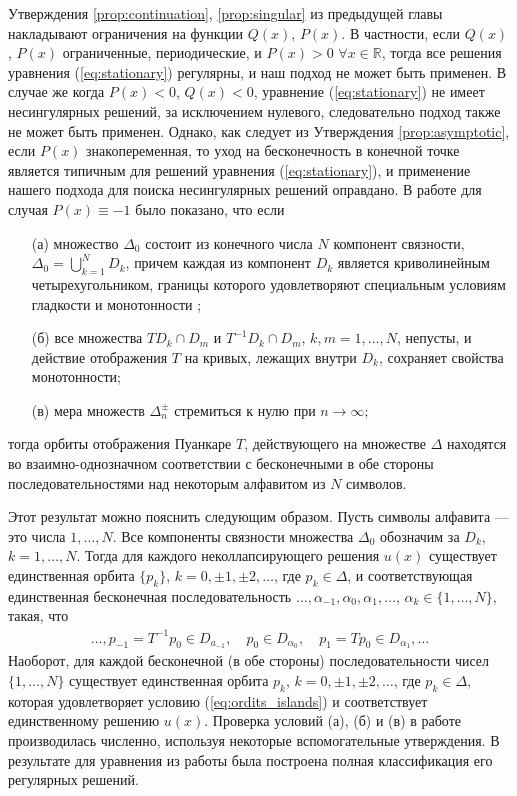 Утверждения \ref{prop:continuation}, \ref{prop:singular} из предыдущей главы накладывают ограничения на функции $Q(x)$, $P(x)$.
В частности, если $Q(x)$, $P(x)$ ограниченные, периодические, и $P(x) > 0$ $\forall x \in \mathbb{R}$, тогда все решения уравнения (\ref{eq:stationary}) регулярны, и наш подход не может быть применен.
В случае же когда $P(x) < 0$, $Q(x) < 0$, уравнение (\ref{eq:stationary}) не имеет несингулярных решений, за исключением нулевого, следовательно подход также не может быть применен.
Однако, как следует из Утверждения \ref{prop:asymptotic}, если $P(x)$ знакопеременная, то уход на бесконечность в конечной точке является типичным для решений уравнения (\ref{eq:stationary}), и применение нашего подхода для поиска несингулярных решений оправдано.
В работе \cite{AlfAvr} для случая $P(x) \equiv -1$ было показано, что если
%
\begin{itemize}
\item[(а)] множество $\Delta_0$ состоит из конечного числа $N$ компонент связности, $\Delta_0 = \bigcup_{k=1}^N D_k$, причем каждая из компонент $D_k$ является криволинейным четырехугольником, границы которого удовлетворяют специальным условиям гладкости и монотонности \cite{AlfAvr};
\item[(б)] все множества $T D_k \cap D_m$ и $T^{-1} D_k \cap D_m$, $k,m = 1, \dots, N$, непусты, и действие отображения $T$ на кривых, лежащих внутри $D_k$, сохраняет свойства монотонности;
\item[(в)] мера множеств $\Delta_n^{\pm}$ стремиться к нулю при $n \to \infty$; 
\end{itemize}
%
тогда орбиты отображения Пуанкаре $T$, действующего на множестве $\Delta$ находятся во взаимно-однозначном соответствии с бесконечными в обе стороны последовательностями над некоторым алфавитом из $N$ символов.

Этот результат можно пояснить следующим образом.
Пусть символы алфавита --- это числа $1, \dots, N$.
Все компоненты связности множества $\Delta_0$ обозначим за $D_k$, $k = 1, \dots, N$.
Тогда для каждого неколлапсирующего решения $u(x)$ существует единственная орбита $\{ p_k \}$, $k = 0, \pm 1, \pm 2, \dots$, где $p_k \in \Delta$, и соответствующая единственная бесконечная последовательность $\dots, \alpha_{-1}, \alpha_0, \alpha_1, \dots$, $\alpha_k \in \{ 1, \dots, N \}$, такая, что
%
\begin{eqnarray}
\dots, p_{-1} = T^{-1} p_0 \in D_{a_{-1}}, \quad p_0 \in D_{\alpha_0}, \quad p_1 = Tp_0 \in D_{\alpha_1}, \dots
\label{eq:ordits_islands}
\end{eqnarray}
%
Наоборот, для каждой бесконечной (в обе стороны) последовательности чисел $\{ 1, \dots, N \}$ существует единственная орбита ${p_k}$, $k = 0, \pm 1, \pm 2, \dots$, где $p_k \in \Delta$, которая удовлетворяет условию (\ref{eq:ordits_islands}) и соответствует единственному решению $u(x)$.
Проверка условий (а), (б) и (в) в работе \cite{AlfAvr} производилась численно, используя некоторые вспомогательные утверждения.
В результате для уравнения из работы \cite{AlfAvr} была построена полная классификация его регулярных решений.

